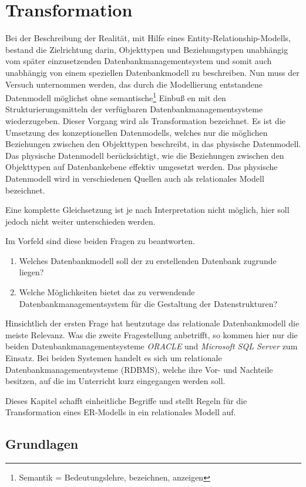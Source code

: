 \chapter{Transformation}
  \chaptertoc{}
  \cleardoubleevenpage
  
    Bei der Beschreibung der Realität, mit Hilfe eines Entity-Relationship-Modells, bestand die Zielrichtung darin, Objekttypen und Beziehungstypen unabhängig vom später einzusetzenden Datenbankmanagementsystem und somit auch unabhängig von einem speziellen Datenbankmodell zu beschreiben. Nun muss der Versuch unternommen werden, das durch die Modellierung entstandene Datenmodell möglichst ohne semantische\footnote{Semantik = Bedeutungslehre, bezeichnen, anzeigen} Einbuß en mit den Strukturierungsmitteln der verfügbaren Datenbankmanagementsysteme wiederzugeben. Dieser Vorgang wird als Transformation bezeichnet. Es ist die Umsetzung des konzeptionellen Datenmodells, welches nur die möglichen Beziehungen zwischen den Objekttypen beschreibt, in das physische Datenmodell. Das physische Datenmodell berücksichtigt, wie die Beziehungen zwischen den Objekttypen auf Datenbankebene effektiv umgesetzt werden. Das physische Datenmodell wird in verschiedenen Quellen auch als relationales Modell
bezeichnet.

    Eine komplette Gleichsetzung ist je nach Interpretation nicht möglich, hier soll jedoch nicht weiter unterschieden werden.

    Im Vorfeld sind diese beiden Fragen zu beantworten.
    \begin{enumerate}
      \item Welches Datenbankmodell soll der zu erstellenden Datenbank zugrunde liegen?
      \item Welche Möglichkeiten bietet das zu verwendende Datenbankmanagementsystem für die Gestaltung der Datenstrukturen?
    \end{enumerate}
    Hinsichtlich der ersten Frage hat heutzutage das relationale Datenbankmodell die meiste Relevanz. Was die zweite Fragestellung anbetrifft, so kommen hier nur die beiden Datenbankmanagementsysteme \textit{ORACLE} und \textit{Microsoft SQL Server} zum Einsatz. Bei beiden Systemen handelt es sich um relationale Datenbankmanagementsysteme (RDBMS), welche ihre Vor- und Nachteile besitzen, auf die im Unterricht kurz eingegangen werden soll.

    Dieses Kapitel schafft einheitliche Begriffe und stellt Regeln für die Transformation eines ER-Modells in ein relationales Modell auf.
\clearpage
    \section{Grundlagen}
